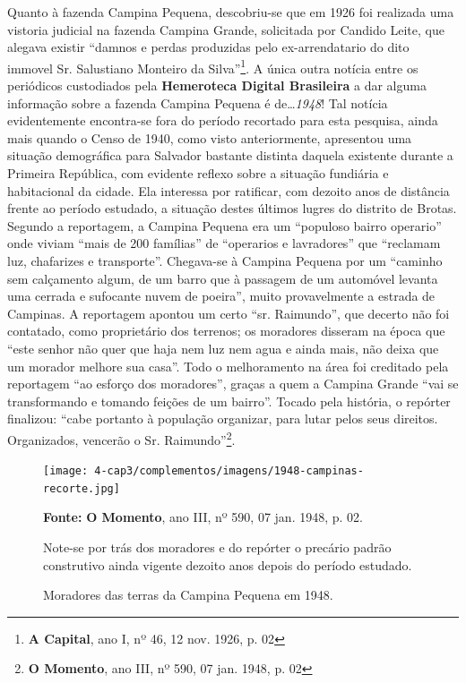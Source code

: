 Quanto à fazenda Campina Pequena, descobriu-se que em 1926 foi realizada uma vistoria judicial na fazenda Campina Grande, solicitada por Candido Leite, que alegava existir ``damnos e perdas produzidas pelo ex-arrendatario do dito immovel Sr. Salustiano Monteiro da Silva''\footnote{\textbf{A Capital}, ano I, nº 46, 12 nov. 1926, p. 02}. A única outra notícia entre os periódicos custodiados pela \textbf{Hemeroteca Digital Brasileira} a dar alguma informação sobre a fazenda Campina Pequena é de\dots \textit{1948}! Tal notícia evidentemente encontra-se fora do período recortado para esta pesquisa, ainda mais quando o Censo de 1940, como visto anteriormente, apresentou uma situação demográfica para Salvador bastante distinta daquela existente durante a Primeira República, com evidente reflexo sobre a situação fundiária e habitacional da cidade. Ela interessa por ratificar, com dezoito anos de distância frente ao período estudado, a situação destes últimos lugres do distrito de Brotas. Segundo a reportagem, a Campina Pequena era um ``populoso bairro operario'' onde viviam ``mais de 200 famílias'' de ``operarios e lavradores'' que ``reclamam luz, chafarizes e transporte''. Chegava-se à Campina Pequena por um ``caminho sem calçamento algum, de um barro que à passagem de um automóvel levanta uma cerrada e sufocante nuvem de poeira'', muito provavelmente a estrada de Campinas. A reportagem apontou um certo ``sr. Raimundo'', que decerto não foi contatado, como proprietário dos terrenos; os moradores disseram na época que ``este senhor não quer que haja nem luz nem agua e ainda mais, não deixa que um morador melhore sua casa''. Todo o melhoramento na área foi creditado pela reportagem ``ao esforço dos moradores'', graças a quem a Campina Grande ``vai se transformando e tomando feições de um bairro''. Tocado pela história, o repórter finalizou: ``cabe portanto à população organizar, para lutar pelos seus direitos. Organizados, vencerão o Sr. Raimundo''\footnote{\textbf{O Momento}, ano III, nº 590, 07 jan. 1948, p. 02}.


\begin{figure}[!htp]
\centering
\caption{Moradores das terras da Campina Pequena em 1948.}
\texttt{[image: 4-cap3/complementos/imagens/1948-campinas-recorte.jpg]}{\par \footnotesize \textbf{Fonte:} \textbf{O Momento}, ano III, nº 590, 07 jan. 1948, p. 02. \par Note-se por trás dos moradores e do repórter o precário padrão construtivo ainda vigente dezoito anos depois do período estudado.}
\label{fig:amaralina1928}
\end{figure}

